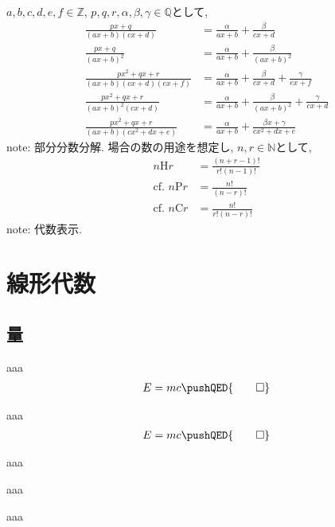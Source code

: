 $a,b,c,d,e,f\in\mathbb{Z}$, $p,q,r,\alpha,\beta,\gamma\in\mathbb{Q}$として, 
\begin{align}
    \frac{px+q}{(ax+b)(cx+d)} &= \frac{\alpha}{ax+b}+\frac{\beta}{cx+d} \\
    \frac{px+q}{(ax+b)^2} &= \frac{\alpha}{ax+b}+\frac{\beta}{(ax+b)^2} \\
    \frac{px^2+qx+r}{(ax+b)(cx+d)(ex+f)} &= \frac{\alpha}{ax+b}+\frac{\beta}{cx+d}+\frac{\gamma}{ex+f} \\
    \frac{px^2+qx+r}{(ax+b)^2(cx+d)} &= \frac{\alpha}{ax+b}+\frac{\beta}{(ax+b)^2}+\frac{\gamma}{cx+d} \\
    \frac{px^2+qx+r}{(ax+b)(cx^2+dx+e)} &= \frac{\alpha}{ax+b}+\frac{\beta x+\gamma}{cx^2+dx+e}
\end{align}
note: 部分分数分解. 
場合の数の用途を想定し, $n,r\in\mathbb{N}$として, 
\begin{align}
    n\text{H}r &= \frac{(n+r-1)!}{r!(n-1)!} \\
    \text{cf. }n\text{P}r &= \frac{n!}{(n-r)!} \\
    \text{cf. }n\text{C}r &= \frac{n!}{r!(n-r)!}
\end{align}
note: 代数表示. 

\chapter{線形代数} %
\label{cha:線形代数}
\section{量} %
\label{sec:量}
\begin{dfn}
    aaa
    \begin{align}
        E = mc \pushQED{\qed}
    \end{align}
\end{dfn}
\begin{theo}
    aaa
    \begin{align}
        E = mc \pushQED{\qed}
    \end{align}
\end{theo}
\begin{prop}
    aaa
\end{prop}
\begin{lemma}
    aaa
\end{lemma}
\begin{cor}
    aaa
\end{cor}

